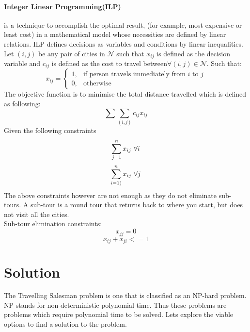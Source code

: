 \documentclass[a4paper]{article}
\begin{document}
\paragraph{Integer Linear Programming(ILP)} is a technique to accomplish the optimal result, (for example, most expensive or least cost) in a mathematical model whose necessities are defined  by linear relations. ILP defines decisions as variables and conditions by linear inequalities.\\
Let $(i,j)$ be any pair of cities in $\mathcal{N}$ such that $x_{ij}$ is defined as the decision variable and $c_{ij}$ is defined as the cost to travel between$\forall (i,j) \in \mathcal{N}$. Such that:\\
\begin{equation*}
    x_{ij} =    
    \begin{cases}
    1, & \text{if person travels immediately from $i$ to $j$} \\
    0, & \text{otherwise}    
    \end{cases}
\end{equation*}
The objective function is to minimise the total distance travelled which is defined as following:
\begin{equation*}
    \sum\sum_{(i,j)}c_{ij}x_{ij}
\end{equation*}
Given the following constraints
\begin{equation*}
    \sum_{j=1}^{n}x_{ij}\textnormal{  }\forall i
\end{equation*}
\begin{equation*}
    \sum_{i=1)}^{n}x_{ij}\textnormal{  }\forall j
\end{equation*}
The above constraints however are not enough as they do not eliminate sub-tours. A sub-tour is  a round tour that returns back to where you start, but does not visit all the cities. \\
Sub-tour elimination constraints:\\
\begin{equation*}
    x_{jj}=0
\end{equation*}
\begin{equation*}
    x_{ij} + x_{ji} <= 1
\end{equation*}

\section{Solution}
The Travelling Salesman problem is one that is classified as an NP-hard problem. NP stands for non-deterministic polynomial time. Thus these problems are problems which require polynomial time to be solved. Lets explore the viable options to find a solution to the problem.
\end{document}
